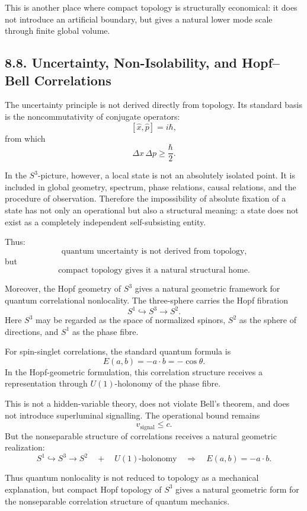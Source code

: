 \documentclass[12pt,a4paper]{article}
\theoremstyle{definition}
\begin{document}
This is another place where compact topology is structurally economical: it does not introduce an artificial boundary, but gives a natural lower mode scale through finite global volume.

\subsection*{8.8. Uncertainty, Non-Isolability, and Hopf--Bell Correlations}

The uncertainty principle is not derived directly from topology. Its standard basis is the noncommutativity of conjugate operators:
\[
[\widehat x,\widehat p]=i\hbar,
\]
from which
\[
\Delta x\,\Delta p\geq \frac{\hbar}{2}.
\]

In the \(S^3\)-picture, however, a local state is not an absolutely isolated point. It is included in global geometry, spectrum, phase relations, causal relations, and the procedure of observation. Therefore the impossibility of absolute fixation of a state has not only an operational but also a structural meaning: a state does not exist as a completely independent self-subsisting entity.

Thus:
\[
\text{quantum uncertainty is not derived from topology,}
\]
but
\[
\text{compact topology gives it a natural structural home}.
\]

Moreover, the Hopf geometry of \(S^3\) gives a natural geometric framework for quantum correlational nonlocality. The three-sphere carries the Hopf fibration
\[
S^1\hookrightarrow S^3\to S^2.
\]
Here \(S^3\) may be regarded as the space of normalized spinors, \(S^2\) as the sphere of directions, and \(S^1\) as the phase fibre.

For spin-singlet correlations, the standard quantum formula is
\[
E(a,b)=-a\cdot b=-\cos\theta.
\]
In the Hopf-geometric formulation, this correlation structure receives a representation through \(U(1)\)-holonomy of the phase fibre.

This is not a hidden-variable theory, does not violate Bell's theorem, and does not introduce superluminal signalling. The operational bound remains
\[
v_{\mathrm{signal}}\leq c.
\]
But the nonseparable structure of correlations receives a natural geometric realization:
\[
S^1\hookrightarrow S^3\to S^2
\quad+\quad
U(1)\text{-holonomy}
\quad\Rightarrow\quad
E(a,b)=-a\cdot b.
\]

Thus quantum nonlocality is not reduced to topology as a mechanical explanation, but compact Hopf topology of \(S^3\) gives a natural geometric form for the nonseparable correlation structure of quantum mechanics.
\end{document}
